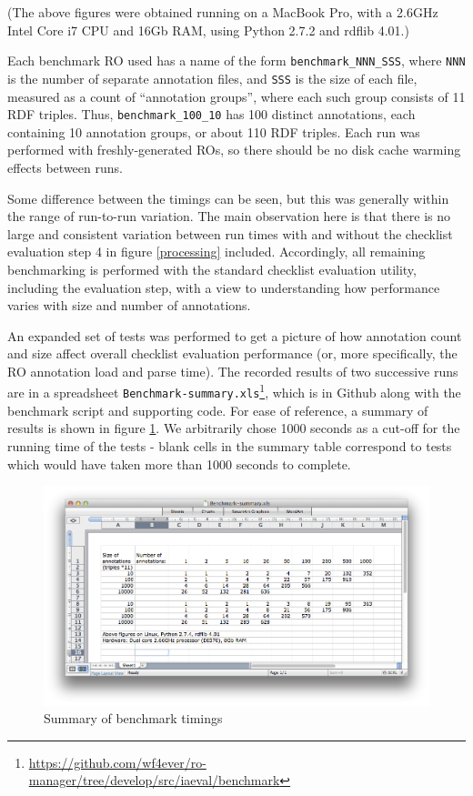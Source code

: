 (The above figures were obtained running on a MacBook Pro, with a 2.6GHz
Intel Core i7 CPU and 16Gb RAM, using Python 2.7.2 and rdflib 4.01.)

Each benchmark RO used has a name of the form
\texttt{benchmark\_NNN\_SSS}, where \texttt{NNN} is the number of
separate annotation files, and \texttt{SSS} is the size of each file,
measured as a count of ``annotation groups'', where each such group
consists of 11 RDF triples. Thus, \texttt{benchmark\_100\_10} has 100
distinct annotations, each containing 10 annotation groups, or about 110
RDF triples. Each run was performed with freshly-generated ROs, so there
should be no disk cache warming effects between runs.

Some difference between the timings can be seen, but this was generally
within the range of run-to-run variation. The main observation here is
that there is no large and consistent variation between run times with
and without the checklist evaluation step 4 in figure \ref{processing}
included. Accordingly, all remaining benchmarking is performed with the
standard checklist evaluation utility, including the evaluation step,
with a view to understanding how performance varies with size and number
of annotations.

An expanded set of tests was performed to get a picture of how
annotation count and size affect overall checklist evaluation
performance (or, more specifically, the RO annotation load and parse
time). The recorded results of two successive runs are in a spreadsheet
\texttt{Benchmark-summary.xls}\footnote{\url{https://github.com/wf4ever/ro-manager/tree/develop/src/iaeval/benchmark}},
which is in Github along with the benchmark script and supporting code.
For ease of reference, a summary of results is shown in figure
\ref{timings}. We arbitrarily chose 1000 seconds as a cut-off for the
running time of the tests - blank cells in the summary table correspond
to tests which would have taken more than 1000 seconds to complete.

\begin{figure}[htbp]
\centering
\includegraphics{figures/Benchmark-summary.png}
\caption{Summary of benchmark timings \label{timings}}
\end{figure}

